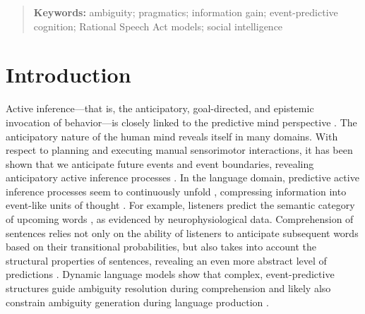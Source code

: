 \documentclass[10pt,a4paper]{article}
\begin{document}
\begin{abstract}

\textbf{Keywords:} 
ambiguity; pragmatics; information gain; event-predictive cognition; Rational Speech Act models; social intelligence
\end{abstract}



\section{Introduction}

Active inference---that is, the anticipatory, goal-directed, and epistemic invocation of behavior---is
closely linked to the predictive mind perspective \cite{Friston:2015,Hohwy:2013,Clark:2016}. 
The anticipatory nature of the human mind reveals itself in many domains.
With respect to planning and executing manual sensorimotor interactions, 
it has been shown that we anticipate future events and event boundaries, revealing anticipatory active inference processes \cite{belardinelli2016s, belardinelli2018mental,Friston:2015,Hayhoe:2003,lohmann2019hands}.
In the language domain, predictive active inference processes seem to continuously unfold \cite{Christiansen:2016}, compressing information into event-like units of thought \cite{Gaerdenfors:2014}.
For example, listeners predict the semantic category of upcoming words \cite{federmeier2002picture}, as evidenced by neurophysiological data.
Comprehension of sentences relies not only on the ability of listeners to anticipate subsequent words based on their transitional probabilities, but also takes into account the structural properties of sentences, revealing an even more abstract level of predictions \cite{levy2008expectation}.
Dynamic language models show that complex, event-predictive structures guide ambiguity resolution during comprehension and likely also constrain ambiguity generation during language production \cite{Elman:2019}. 
\end{document}
